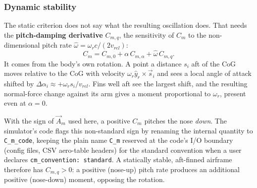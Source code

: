 \subsubsection{Dynamic stability}\label{sec:analysis_dynamic}
The static criterion does not say what the resulting oscillation does. That needs the
\textbf{pitch-damping derivative} $C_{m,q}$, the sensitivity of $C_m$ to the non-dimensional pitch
rate $\hat{\omega}=\omega_r c/(2v_{rel})$:
\begin{equation}
    C_m = C_{m,0} + \alpha\,C_{m,\alpha} + \hat{\omega}\,C_{m,q}.
\end{equation}
It comes from the body's own rotation. A point a distance $s_i$ aft of the CoG moves relative to
the CoG with velocity $\omega_r\hat{y}_r\times\vec{s}_i$ and sees a local angle of attack shifted
by $\Delta\alpha_i\approx+\omega_r s_i/v_{rel}$. Fins well aft see the largest shift, and the
resulting normal-force change against its arm gives a moment proportional to $\omega_r$, present
even at $\alpha=0$.

With the sign of $\vec{A}_m$ used here, a positive $C_m$ pitches the nose \emph{down}. The simulator's
code flags this non-standard sign by renaming the internal quantity to \texttt{C\_m\_code}, keeping the
plain name \texttt{C\_m} reserved at the code's I/O boundary (config files, CSV aero-table headers) for
the standard convention when a user declares \texttt{cm\_convention: standard}. A statically stable,
aft-finned airframe therefore has $C_{m,q}>0$: a positive (nose-up) pitch rate
produces an additional positive (nose-down) moment, opposing the rotation.


